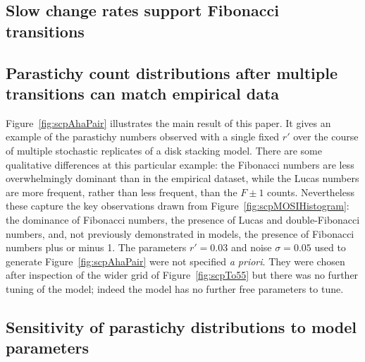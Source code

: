  


\subsection{Slow change rates support Fibonacci transitions}


\clearpage
\subsection{Parastichy count distributions after multiple transitions can match empirical data}
Figure~\ref{fig:scpAhaPair} illustrates the main result of this paper. It gives an example of the parastichy numbers observed with a single fixed $r'$ over the course of multiple stochastic replicates of a disk stacking model.    There are some qualitative differences at this particular example: the Fibonacci numbers are less overwhelmingly dominant than in the empirical dataset, while the Lucas numbers are more frequent, rather than less frequent, than the $F\pm1$ counts. Nevertheless these capture the key observations drawn from  Figure~\ref{fig:scpMOSIHistogram}: the dominance of Fibonacci numbers, the  presence of Lucas and double-Fibonacci numbers, and,  not previously demonstrated in models, the presence of Fibonacci numbers plus or minus 1. 
The parameters $r'=0.03$ and noise $\sigma=0.05$ used to generate Figure~\ref{fig:scpAhaPair} were not specified \textit{a priori}. They were chosen after inspection of the wider grid of Figure~\ref{fig:scpTo55} but there was no further tuning of the model;  indeed the model has no further free parameters to tune.


\subsection{Sensitivity of parastichy distributions to model parameters}

